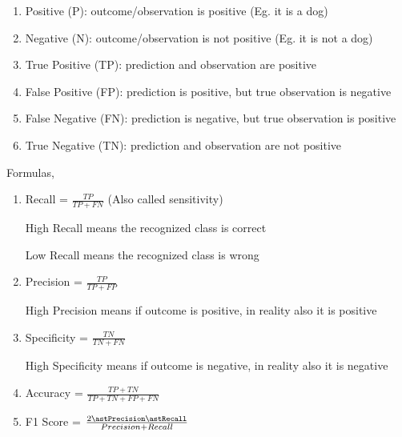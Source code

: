 \documentclass[12pt]{article}
\renewcommand{\_}{\kern-1.5pt\textunderscore\kern-1.5pt}
\begin{document}
\begin{enumerate}
	\item Positive (P): outcome/observation is positive (Eg. it is a dog)\par

	\item Negative (N): outcome/observation is not positive (Eg. it is not a dog)\par

	\item True Positive (TP): prediction and observation are positive\par

	\item False Positive (FP): prediction is positive, but true observation is negative \par

	\item False Negative (FN): prediction is negative, but true observation is positive\par

	\item True Negative (TN): prediction and observation are not positive
\end{enumerate}\par

Formulas,\par

\begin{enumerate}
	\item Recall =  \( \frac{TP}{TP+FN} \)  (Also called sensitivity)\par

High Recall means the recognized class is correct\par

Low Recall means the recognized class is wrong\par


\vspace{\baselineskip}
	\item Precision =  \( \frac{TP}{TP+FP} \) \par

High Precision means if outcome is positive, in reality also it is positive\par

	\item Specificity =  \( \frac{TN}{TN+FN} \) \par

High Specificity means if outcome is negative, in reality also it is negative\par


\vspace{\baselineskip}
	\item Accuracy =  \( \frac{TP+TN}{TP+TN+FP+FN} \) \par


\vspace{\baselineskip}
	\item F1 Score =  \( \frac{2\astPrecision\astRecall}{Precision+Recall} \) 
\end{enumerate}\par
\end{document}
